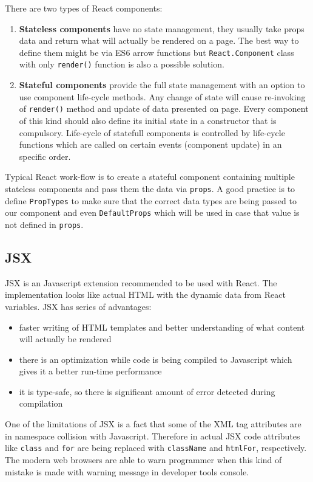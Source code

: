 There are two types of React components\cite{React}:
\begin{enumerate}
\item \textbf{Stateless components} have no state management, they usually take props data and return what will actually be rendered on a page. The best way to define them might be via ES6 arrow functions\cite{arrowFunctions} but \texttt{React.Component} class with only \texttt{render()} function is also a possible solution.

\item \textbf{Stateful components} provide the full state management with an option to use component life-cycle methods. Any change of state will cause re-invoking of \texttt{render()} method and update of data presented on page. Every component of this kind should also define its initial state in a constructor that is compulsory.
Life-cycle of statefull components is controlled by life-cycle functions which are called on certain events (component update) in an specific order.
\end{enumerate}

Typical React work-flow is to create a stateful component containing multiple stateless components and pass them the data via \texttt{props}. A good practice is to define \texttt{PropTypes} to make sure that the correct data types are being passed to our component and even \texttt{DefaultProps} which will be used in case that value is not defined in \texttt{props}. 

\subsection{JSX} 
JSX\cite{JSX} is an Javascript extension recommended to be used with React. The implementation looks like actual HTML with the dynamic data from React variables. JSX has series of advantages:
\begin{itemize}
\item faster writing of HTML templates and better understanding of what content will actually be rendered
\item there is an optimization while code is being compiled to Javascript which gives it a better run-time performance
\item it is type-safe, so there is significant amount of error detected during compilation
\end{itemize}  

One of the limitations of JSX is a fact that some of the XML tag attributes are in namespace collision with Javascript. Therefore in actual JSX code attributes like \texttt{class} and \texttt{for} are being replaced with \texttt{className} and \texttt{htmlFor}, respectively. The modern web browsers are able to warn programmer when this kind of mistake is made with warning message in developer tools console. 


